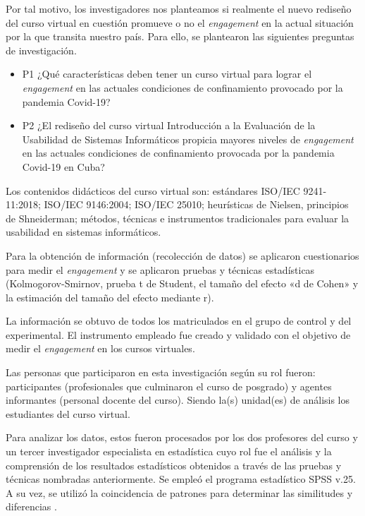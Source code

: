 \documentclass[spanish]{textolivre}
\begin{document}
Por tal motivo, los investigadores nos planteamos si realmente el nuevo rediseño del curso virtual en cuestión promueve o no el \emph{engagement} en la actual situación por la que transita nuestro país. Para ello, se plantearon las siguientes preguntas de investigación.

\begin{itemize}
    \item P1 ¿Qué características deben tener un curso virtual para lograr el \emph{engagement} en las actuales condiciones de confinamiento provocado por la pandemia Covid-19?
    \item P2 ¿El rediseño del curso virtual Introducción a la Evaluación de la Usabilidad de Sistemas Informáticos propicia mayores niveles de \emph{engagement} en las actuales condiciones de confinamiento provocada por la pandemia Covid-19 en Cuba?
\end{itemize}

Los contenidos didácticos del curso virtual son: estándares ISO/IEC 9241-11:2018; ISO/IEC 9146:2004; ISO/IEC 25010; heurísticas de Nielsen, principios de Shneiderman; métodos, técnicas e instrumentos tradicionales para evaluar la usabilidad en sistemas informáticos. 

Para la obtención de información (recolección de datos) se aplicaron cuestionarios para medir el \emph{engagement} y se aplicaron pruebas y técnicas estadísticas (Kolmogorov-Smirnov, prueba t de Student, el tamaño del efecto «d de Cohen» y la estimación del tamaño del efecto mediante r).

La información se obtuvo de todos los matriculados en el grupo de control y del experimental. El instrumento empleado \cite{mohd2020} %
fue creado y validado con el objetivo de medir el \emph{engagement} en los cursos virtuales.

Las personas que participaron en esta investigación según su rol fueron: participantes (profesionales que culminaron el curso de posgrado) y agentes informantes (personal docente del curso). Siendo la(s) unidad(es) de análisis los estudiantes  del curso virtual.

Para analizar los datos, estos fueron procesados por los dos profesores del curso y un tercer investigador especialista en estadística cuyo rol fue el análisis y la comprensión de los resultados estadísticos obtenidos  a través de las pruebas y técnicas nombradas anteriormente. Se empleó el programa estadístico SPSS  v.25. A su vez, se utilizó la coincidencia de patrones para determinar las similitudes y diferencias \cite{miles2014}. %
\end{document}
